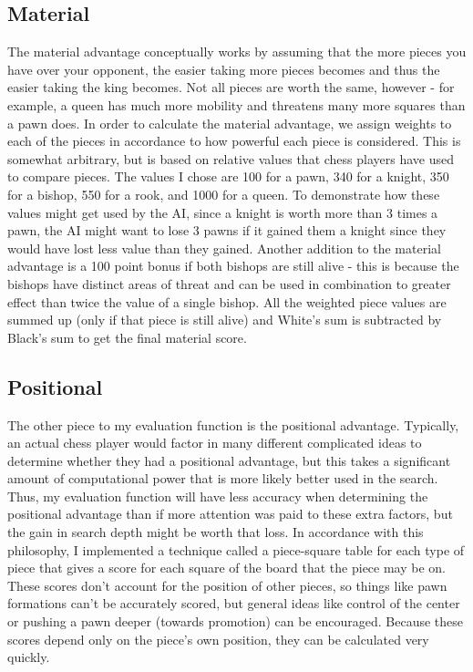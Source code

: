 \documentclass[10pt]{article}
\begin{document}
\subsection{Material}

The material advantage conceptually works by assuming that the more pieces you have over your opponent, the easier taking more pieces becomes and thus the easier taking the king becomes. Not all pieces are worth the same, however - for example, a queen has much more mobility and threatens many more squares than a pawn does. In order to calculate the material advantage, we assign weights to each of the pieces in accordance to how powerful each piece is considered. This is somewhat arbitrary, but is based on relative values that chess players have used to compare pieces. The values I chose are 100 for a pawn, 340 for a knight, 350 for a bishop, 550 for a rook, and 1000 for a queen. To demonstrate how these values might get used by the AI, since a knight is worth more than 3 times a pawn, the AI might want to lose 3 pawns if it gained them a knight since they would have lost less value than they gained. Another addition to the material advantage is a 100 point bonus if both bishops are still alive - this is because the bishops have distinct areas of threat and can be used in combination to greater effect than twice the value of a single bishop. All the weighted piece values are summed up (only if that piece is still alive) and White's sum is subtracted by Black's sum to get the final material score. 

\subsection{Positional}
The other piece to my evaluation function is the positional advantage. Typically, an actual chess player would factor in many different complicated ideas to determine whether they had a positional advantage, but this takes a significant amount of computational power that is more likely better used in the search. Thus, my evaluation function will have less accuracy when determining the positional advantage than if more attention was paid to these extra factors, but the gain in search depth might be worth that loss. In accordance with this philosophy, I implemented a technique called a piece-square table for each type of piece that gives a score for each square of the board that the piece may be on. These scores don't account for the position of other pieces, so things like pawn formations can't be accurately scored, but general ideas like control of the center or pushing a pawn deeper (towards promotion) can be encouraged. Because these scores depend only on the piece's own position, they can be calculated very quickly. 
\end{document}
